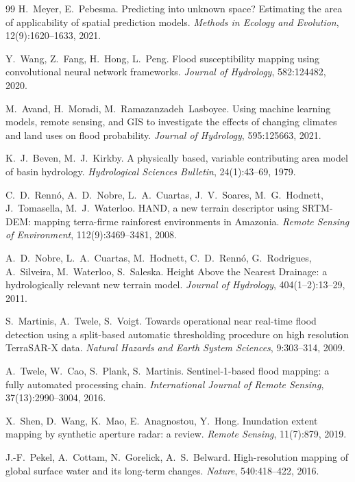 \documentclass[journal]{IEEEtran}
\begin{document}
\begin{thebibliography}{99}
H.~Meyer, E.~Pebesma.
Predicting into unknown space? Estimating the area of applicability of spatial
prediction models.
\emph{Methods in Ecology and Evolution}, 12(9):1620--1633, 2021.

Y.~Wang, Z.~Fang, H.~Hong, L.~Peng.
Flood susceptibility mapping using convolutional neural network frameworks.
\emph{Journal of Hydrology}, 582:124482, 2020.

M.~Avand, H.~Moradi, M.~Ramazanzadeh~Lasboyee.
Using machine learning models, remote sensing, and GIS to investigate the effects
of changing climates and land uses on flood probability.
\emph{Journal of Hydrology}, 595:125663, 2021.

K.~J.~Beven, M.~J.~Kirkby.
A physically based, variable contributing area model of basin hydrology.
\emph{Hydrological Sciences Bulletin}, 24(1):43--69, 1979.

C.~D.~Renn\'o, A.~D.~Nobre, L.~A.~Cuartas, J.~V.~Soares, M.~G.~Hodnett,
J.~Tomasella, M.~J.~Waterloo.
HAND, a new terrain descriptor using SRTM-DEM: mapping terra-firme rainforest
environments in Amazonia.
\emph{Remote Sensing of Environment}, 112(9):3469--3481, 2008.

A.~D.~Nobre, L.~A.~Cuartas, M.~Hodnett, C.~D.~Renn\'o, G.~Rodrigues, A.~Silveira,
M.~Waterloo, S.~Saleska.
Height Above the Nearest Drainage: a hydrologically relevant new terrain model.
\emph{Journal of Hydrology}, 404(1--2):13--29, 2011.

S.~Martinis, A.~Twele, S.~Voigt.
Towards operational near real-time flood detection using a split-based automatic
thresholding procedure on high resolution TerraSAR-X data.
\emph{Natural Hazards and Earth System Sciences}, 9:303--314, 2009.

A.~Twele, W.~Cao, S.~Plank, S.~Martinis.
Sentinel-1-based flood mapping: a fully automated processing chain.
\emph{International Journal of Remote Sensing}, 37(13):2990--3004, 2016.

X.~Shen, D.~Wang, K.~Mao, E.~Anagnostou, Y.~Hong.
Inundation extent mapping by synthetic aperture radar: a review.
\emph{Remote Sensing}, 11(7):879, 2019.

J.-F.~Pekel, A.~Cottam, N.~Gorelick, A.~S.~Belward.
High-resolution mapping of global surface water and its long-term changes.
\emph{Nature}, 540:418--422, 2016.


\end{thebibliography}
\end{document}
